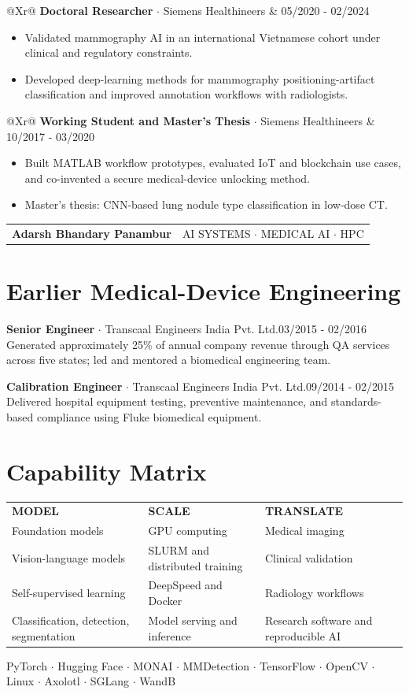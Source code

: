 \documentclass[10pt,a4paper]{article}
\makeatletter
\newcommand{\role}[4]{%
  \begin{tabularx}{\textwidth}{@{}Xr@{}}
    \textbf{#1} $\cdot$ \textcolor{accent}{#2} & \textcolor{muted}{\footnotesize #3}\\
    \multicolumn{2}{@{}l@{}}{\textcolor{muted}{\footnotesize #4}}
  \end{tabularx}\vspace{-1pt}}
\newcommand{\compactrole}[4]{\textbf{#1} $\cdot$ \textcolor{accent}{#2}\hfill\textcolor{muted}{\footnotesize #3}\\[-1pt]\textcolor{muted}{\footnotesize #4}\par\vspace{3pt}}
\makeatother
\begin{document}
\role{Doctoral Researcher}{Siemens Healthineers}{05/2020 - 02/2024}{Erlangen, Germany}
\begin{itemize}
  \item Validated mammography AI in an international Vietnamese cohort under clinical and regulatory constraints.
  \item Developed deep-learning methods for mammography positioning-artifact classification and improved annotation workflows with radiologists.
\end{itemize}

\role{Working Student and Master's Thesis}{Siemens Healthineers}{10/2017 - 03/2020}{Erlangen, Germany}
\begin{itemize}
  \item Built MATLAB workflow prototypes, evaluated IoT and blockchain use cases, and co-invented a secure medical-device unlocking method.
  \item Master's thesis: CNN-based lung nodule type classification in low-dose CT.
\end{itemize}

\newpage
\begin{tabularx}{\textwidth}{@{}Xr@{}}
  {\fontsize{17}{19}\selectfont\bfseries Adarsh Bhandary Panambur} & \textcolor{accent}{AI SYSTEMS $\cdot$ MEDICAL AI $\cdot$ HPC}
\end{tabularx}

\section{Earlier Medical-Device Engineering}
\compactrole{Senior Engineer}{Transcaal Engineers India Pvt. Ltd.}{03/2015 - 02/2016}{Generated approximately 25\% of annual company revenue through QA services across five states; led and mentored a biomedical engineering team.}
\compactrole{Calibration Engineer}{Transcaal Engineers India Pvt. Ltd.}{09/2014 - 02/2015}{Delivered hospital equipment testing, preventive maintenance, and standards-based compliance using Fluke biomedical equipment.}

\section{Capability Matrix}
\begin{tabularx}{\textwidth}{@{}X X X@{}}
\textbf{MODEL} & \textbf{SCALE} & \textbf{TRANSLATE}\\[2pt]
Foundation models & GPU computing & Medical imaging\\
Vision-language models & SLURM and distributed training & Clinical validation\\
Self-supervised learning & DeepSpeed and Docker & Radiology workflows\\
Classification, detection, segmentation & Model serving and inference & Research software and reproducible AI
\end{tabularx}
\vspace{3pt}
\textcolor{muted}{\footnotesize PyTorch $\cdot$ Hugging Face $\cdot$ MONAI $\cdot$ MMDetection $\cdot$ TensorFlow $\cdot$ OpenCV $\cdot$ Linux $\cdot$ Axolotl $\cdot$ SGLang $\cdot$ WandB}
\end{document}
